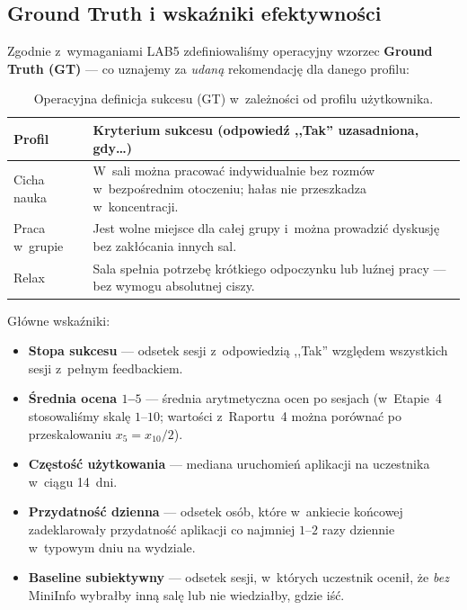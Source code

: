 \documentclass[14pt,a4paper]{extarticle}
\begin{document}
\subsection{Ground Truth i wskaźniki efektywności}

Zgodnie z~wymaganiami LAB5 zdefiniowaliśmy operacyjny wzorzec \textbf{Ground Truth (GT)} --- co uznajemy za \emph{udaną} rekomendację dla danego profilu:

\begin{table}[H]
    \centering
    \caption{Operacyjna definicja sukcesu (GT) w~zależności od profilu użytkownika.}
    \label{tab:gt}
    \begin{tabular}{|l|p{9cm}|}
        \hline
        \textbf{Profil} & \textbf{Kryterium sukcesu (odpowiedź ,,Tak'' uzasadniona, gdy\ldots)} \\
        \hline
        Cicha nauka & W~sali można pracować indywidualnie bez rozmów w~bezpośrednim otoczeniu; hałas nie przeszkadza w~koncentracji. \\
        \hline
        Praca w~grupie & Jest wolne miejsce dla całej grupy i~można prowadzić dyskusję bez zakłócania innych sal. \\
        \hline
        Relax & Sala spełnia potrzebę krótkiego odpoczynku lub luźnej pracy --- bez wymogu absolutnej ciszy. \\
        \hline
    \end{tabular}
\end{table}

Główne wskaźniki:
\begin{itemize}
    \item \textbf{Stopa sukcesu} --- odsetek sesji z~odpowiedzią ,,Tak'' względem wszystkich sesji z~pełnym feedbackiem.
    \item \textbf{Średnia ocena $1$--$5$} --- średnia arytmetyczna ocen po sesjach (w~Etapie~4 stosowaliśmy skalę $1$--$10$; wartości z~Raportu~4 można porównać po przeskalowaniu $x_5 = x_{10}/2$).
    \item \textbf{Częstość użytkowania} --- mediana uruchomień aplikacji na uczestnika w~ciągu 14~dni.
    \item \textbf{Przydatność dzienna} --- odsetek osób, które w~ankiecie końcowej zadeklarowały przydatność aplikacji co najmniej $1$--$2$ razy dziennie w~typowym dniu na wydziale.
    \item \textbf{Baseline subiektywny} --- odsetek sesji, w~których uczestnik ocenił, że \emph{bez} MiniInfo wybrałby inną salę lub nie wiedziałby, gdzie iść.
\end{itemize}
\end{document}
